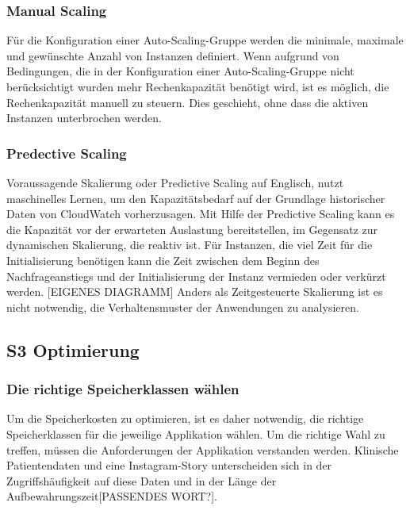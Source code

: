 {\subsubsection{ Manual Scaling }
Für die Konfiguration einer Auto-Scaling-Gruppe werden die minimale, maximale und gewünschte Anzahl von Instanzen definiert. Wenn aufgrund von Bedingungen, die in der Konfiguration einer Auto-Scaling-Gruppe nicht berücksichtigt wurden mehr Rechenkapazität benötigt wird, ist es möglich, die Rechenkapazität manuell zu steuern. Dies geschieht, ohne dass die aktiven Instanzen unterbrochen werden.

\subsubsection{Predective Scaling}%
Voraussagende Skalierung oder Predictive Scaling auf Englisch, nutzt maschinelles Lernen, um den Kapazitätsbedarf auf der Grundlage historischer Daten von CloudWatch vorherzusagen. Mit Hilfe der Predictive Scaling kann es die Kapazität vor der erwarteten Auslastung bereitstellen, im Gegensatz zur dynamischen Skalierung, die reaktiv ist. 
Für Instanzen, die viel Zeit für die Initialisierung benötigen kann die Zeit zwischen dem Beginn des Nachfrageanstiegs und der Initialisierung der Instanz vermieden oder verkürzt werden.
[EIGENES DIAGRAMM]
Anders als Zeitgesteuerte Skalierung ist es nicht notwendig, die Verhaltensmuster der Anwendungen zu analysieren.

\subsection{S3 Optimierung}

\subsubsection{Die richtige Speicherklassen wählen}
Um die Speicherkosten zu optimieren, ist es daher notwendig, die richtige Speicherklassen für die jeweilige Applikation wählen. Um die richtige Wahl zu treffen, müssen die Anforderungen der Applikation verstanden werden. Klinische Patientendaten und eine Instagram-Story unterscheiden sich in der Zugriffshäufigkeit auf diese Daten und in der Länge der Aufbewahrungszeit[PASSENDES WORT?].

}
